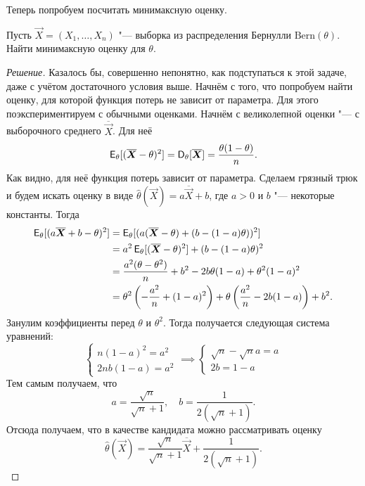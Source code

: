 Теперь попробуем посчитать минимаксную оценку.
\begin{problem}
    Пусть $\vec{X} = (X_{1}, \ldots, X_{n})$ "--- выборка из распределения Бернулли $\mathrm{Bern}(\theta)$. Найти минимаксную оценку для $\theta$.
\end{problem}
\begin{proof}[Решение]
    Казалось бы, совершенно непонятно, как подступаться к этой задаче, даже с учётом достаточного условия выше. Начнём с того, что попробуем найти оценку, для которой функция потерь не зависит от параметра. Для этого поэкспериментируем с обычными оценками. Начнём с великолепной оценки "--- с выборочного среднего $\overline{\vec{X}}$. Для неё
    \[
        \operatorname{\mathsf{E}}_{\theta}[(\overline{\bm{X}} - \theta)^{2}] = \operatorname{\mathsf{D}}_{\theta}[\overline{\bm{X}}] = \frac{\theta(1 - \theta)}{n}.
    \]
    Как видно, для неё функция потерь зависит от параметра. Сделаем грязный трюк и будем искать оценку в виде $\hat{\theta}(\vec{X}) = a\overline{\vec{X}} + b$, где $a > 0$ и $b$ "--- некоторые константы. Тогда
    \begin{align*}
        \operatorname{\mathsf{E}}_{\theta}[(a\overline{\bm{X}} + b - \theta)^{2}]
        &= \operatorname{\mathsf{E}}_{\theta}[(a(\overline{\bm{X}} - \theta) + (b - (1 - a)\theta))^{2}] \\
        &= a^2\operatorname{\mathsf{E}}_{\theta}[(\overline{\bm{X}} - \theta)^{2}] + (b - (1 - a)\theta)^{2} \\
        &= \frac{a^{2}(\theta - \theta^{2})}{n} + b^{2} - 2b\theta(1 - a) + \theta^{2}(1 - a)^{2} \\
        &= \theta^{2}\left(-\frac{a^{2}}{n} + (1 - a)^{2}\right) + \theta\left(\frac{a^{2}}{n} - 2b(1 - a)\right) + b^{2}.
    \end{align*}
    Занулим коэффициенты перед $\theta$ и $\theta^{2}$. Тогда получается следующая система уравнений:
    \[
        \begin{cases}
        n(1 - a)^{2} = a^{2} \\
        2nb(1 - a) = a^{2}
        \end{cases}
        \implies
        \begin{cases}
        \sqrt{n} - \sqrt{n}a = a \\
        2b = 1 - a
        \end{cases}
    \]
    Тем самым получаем, что
    \[
        a = \frac{\sqrt{n}}{\sqrt{n} + 1}, \quad b = \frac{1}{2(\sqrt{n} + 1)}.
    \]
    Отсюда получаем, что в качестве кандидата можно рассматривать оценку
    \[
        \hat{\theta}(\vec{X}) = \frac{\sqrt{n}}{\sqrt{n} + 1}\overline{\vec{X}} + \frac{1}{2(\sqrt{n} + 1)}.
\]
\end{proof}
